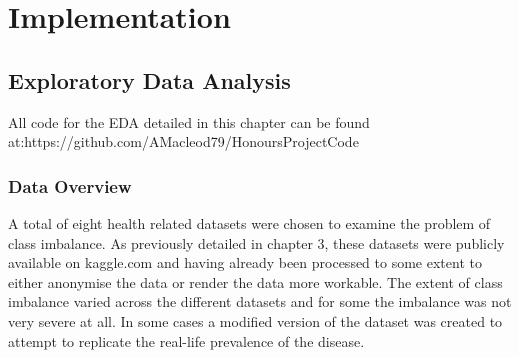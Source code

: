 \chapter{Implementation}\label{ch:Implementation}

\section{Exploratory Data Analysis}
All code for the EDA detailed in this chapter can be found at:\newline https://github.com/AMacleod79/HonoursProjectCode
\subsection{Data Overview}

A total of eight health related datasets were chosen to examine the problem of class imbalance. As previously detailed in chapter 3, these datasets were publicly available on kaggle.com and having already been processed to some extent to either anonymise the data or render the data more workable.\newline
The extent of class imbalance varied across the different datasets and for some the imbalance was not very severe at all. In some cases a modified version of the dataset was created to attempt to replicate the real-life prevalence of the disease.\newline

